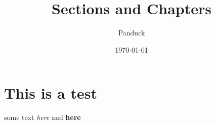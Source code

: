 \documentclass{article}
\title{Sections and Chapters}
\author{Panduck}
\date{\today}
\begin{document}
\section{This is a test}
\label{sec:this-is-a-test}

some text \emph{here} and \textbf{here}
\end{document}
